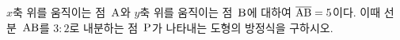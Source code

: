 $x$축 위를 움직이는 점~$\mathrm{A}$와 $y$축 위를 움직이는 점~$\mathrm{B}$에 대하여 $\overline{\mathrm{AB}}=5$이다. 이때 선분~$\mathrm{AB}$를 $3:2$로 내분하는 점~$\mathrm{P}$가 나타내는 도형의 방정식을 구하시오.
